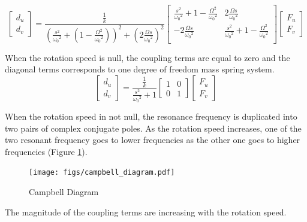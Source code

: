 \documentclass{ISMA_USD2020}
\begin{document}
\begin{equation}
\label{eq:coupled_plant}
\begin{bmatrix} d_u \\ d_v \end{bmatrix} =
\frac{\frac{1}{k}}{\left( \frac{s^2}{{\omega_0}^2} + (1 - \frac{{\Omega}^2}{{\omega_0}^2}) \right)^2 + \left( 2 \frac{{\Omega} s}{{\omega_0}^2} \right)^2}
\begin{bmatrix}
  \frac{s^2}{{\omega_0}^2} + 1 - \frac{{\Omega}^2}{{\omega_0}^2} & 2 \frac{\Omega s}{{\omega_0}^2} \\
  -2 \frac{\Omega s}{{\omega_0}^2}          & \frac{s^2}{{\omega_0}^2} + 1 - \frac{{\Omega}^2}{{\omega_0}^2} \\
\end{bmatrix}
\begin{bmatrix} F_u \\ F_v \end{bmatrix}
\end{equation}

When the rotation speed is null, the coupling terms are equal to zero and the diagonal terms corresponds to one degree of freedom mass spring system.
\begin{equation}
\label{eq:coupled_plant_no_rot}
\begin{bmatrix} d_u \\ d_v \end{bmatrix} =
\frac{\frac{1}{k}}{\frac{s^2}{{\omega_0}^2} + 1}
\begin{bmatrix}
  1 & 0 \\
  0 & 1
\end{bmatrix}
\begin{bmatrix} F_u \\ F_v \end{bmatrix}
\end{equation}

When the rotation speed in not null, the resonance frequency is duplicated into two pairs of complex conjugate poles.
As the rotation speed increases, one of the two resonant frequency goes to lower frequencies as the other one goes to higher frequencies (Figure \ref{fig:campbell_diagram}).

\begin{figure}[htbp]
\centering
\texttt{[image: figs/campbell\_diagram.pdf]}
\caption{\label{fig:campbell_diagram}Campbell Diagram}
\end{figure}

The magnitude of the coupling terms are increasing with the rotation speed.
\end{document}
